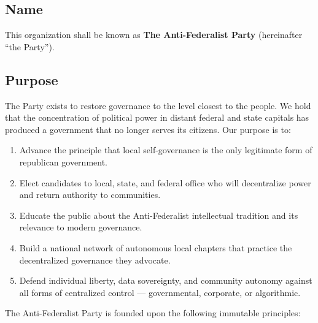 \documentclass[11pt, letterpaper]{article}
\begin{document}

\tableofcontents
\newpage


\subsection{Name}
This organization shall be known as \textbf{The Anti-Federalist Party} (hereinafter ``the Party'').

\subsection{Purpose}
The Party exists to restore governance to the level closest to the people. We hold that the concentration of political power in distant federal and state capitals has produced a government that no longer serves its citizens. Our purpose is to:

\begin{enumerate}
  \item Advance the principle that local self-governance is the only legitimate form of republican government.
  \item Elect candidates to local, state, and federal office who will decentralize power and return authority to communities.
  \item Educate the public about the Anti-Federalist intellectual tradition and its relevance to modern governance.
  \item Build a national network of autonomous local chapters that practice the decentralized governance they advocate.
  \item Defend individual liberty, data sovereignty, and community autonomy against all forms of centralized control --- governmental, corporate, or algorithmic.
\end{enumerate}




The Anti-Federalist Party is founded upon the following immutable principles:
\end{document}
